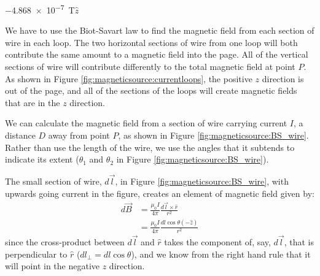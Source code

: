 \begin{finalanswer}
\SI{-4.868e-7}{T}$\hat z$
\end{finalanswer}
\begin{solution}
We have to use the Biot-Savart law to find the magnetic field from each section of wire in each loop. The two horizontal sections of wire from one loop will both contribute the same amount to a magnetic field into the page. All of the vertical sections of wire will contribute differently to the total magnetic field at point $P$. As shown in Figure \ref{fig:magneticsource:currentloops}, the positive $z$ direction is out of the page, and all of the sections of the loops will create magnetic fields that are in the $z$ direction. 


We can calculate the magnetic field from a section of wire carrying current $I$, a distance $D$ away from point $P$, as shown in Figure \ref{fig:magneticsource:BS_wire}. Rather than use the length of the wire, we use the angles that it subtends to indicate its extent ($\theta_1$ and $\theta_2$ in Figure \ref{fig:magneticsource:BS_wire}).

The small section of wire, $d\vec l$, in Figure \ref{fig:magneticsource:BS_wire}, with upwards going current in the figure, creates an element of magnetic field given by:
\begin{align*}
d\vec B&=\frac{\mu_0I}{4\pi} \frac{d\vec l\times \hat r}{r^2}\\
&=\frac{\mu_0I}{4\pi} \frac{dl\cos\theta(-\hat z)}{r^2}
\end{align*}
since the cross-product between $d\vec l$ and $\hat r$ takes the component of, say, $d\vec l$, that is perpendicular to $\hat r$ ($dl_\perp=dl\cos\theta$), and we know from the right hand rule that it will point in the negative $z$ direction.


\end{solution}
